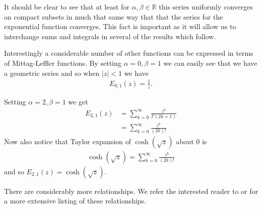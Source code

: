 It should be clear to see that at least for $ \alpha, \beta \in \mathbb{R} $ this series uniformly converges on compact subsets in much that same way that that the series for the exponential function converges. This fact is important as it will allow us to interchange sums and integrals in several of the results which follow.

Interestingly a considerable number of other functions can be expressed in terms of Mittag-Leffler functions. By setting $ \alpha = 0, \beta = 1 $ we can easily see that we have a geometric series and so when $ |z| < 1 $ we have
\begin{align}
    E_{0,1}(z) = \frac{1}{z}.
\end{align}

Setting $ \alpha = 2, \beta = 1 $ we get
\begin{align}
    E_{2,1}(z) &= \sum_{k=0}^\infty \frac{z^k}{\Gamma(2k + 1)} \\
            &= \sum_{k=0}^\infty \frac{z^k}{(2k)!}
\end{align}
Now also notice that Taylor expansion of $ \cosh(\sqrt{z}) $ about 0 is
\begin{align}
    \cosh(\sqrt{z}) = \sum_{k=0}^\infty \frac{z^k}{(2k)!}
\end{align}
and so $ E_{2,1}(z) = \cosh(\sqrt{z}) $. 

There are considerably more relationships. We refer the interested reader to \cite{Podlubny1999} or \cite{Samko1993} for a more extensive listing of these relationships.


